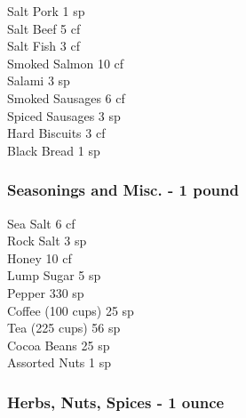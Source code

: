 \begin{multicols}{3}
{Salt Pork				\hfill 1 sp \\
Salt Beef				\hfill 5 cf \\
Salt Fish				\hfill 3 cf \\
Smoked Salmon				\hfill 10 cf \\
Salami				\hfill 3 sp \\
Smoked Sausages				\hfill 6 cf \\
Spiced Sausages				\hfill 3 sp \\
Hard Biscuits				\hfill 3 cf \\
Black Bread				\hfill 1 sp \\


\subsubsection{Seasonings and Misc. - 1 pound}

Sea Salt				\hfill 6 cf \\
Rock Salt				\hfill 3 sp \\
Honey				\hfill 10 cf \\
Lump Sugar				\hfill 5 sp \\
Pepper				\hfill 330 sp \\
Coffee (100 cups)				\hfill 25 sp \\
Tea (225 cups)				\hfill 56 sp \\
Cocoa Beans				\hfill 25 sp \\
Assorted Nuts				\hfill 1 sp \\


\subsubsection{Herbs, Nuts, Spices - 1 ounce}

}
\end{multicols}
